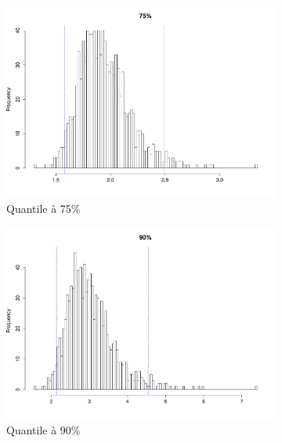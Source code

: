 \documentclass{article}
\renewcommand*{\(}{ \left( }
\renewcommand*{\)}{ \right) }
\begin{document}
\begin{figure}[H]
    \centering
    \begin{subfigure}[t]{0.3\textwidth}
        \includegraphics[width = \linewidth]{img/BootstrapAEMV-75-100.pdf}
        \caption{Quantile à 75\%}
        \label{fig:BAEMV75b} %
    \end{subfigure}%
    \begin{subfigure}[t]{0.3\textwidth}
        \includegraphics[width = \linewidth]{img/BootstrapAEMV-90-100.pdf}
        \caption{Quantile à 90\%}
        \label{fig:BAEMV90b}
    \end{subfigure}%
    \begin{subfigure}[t]{0.3\textwidth}

\end{subfigure}
\end{figure}
\end{document}
